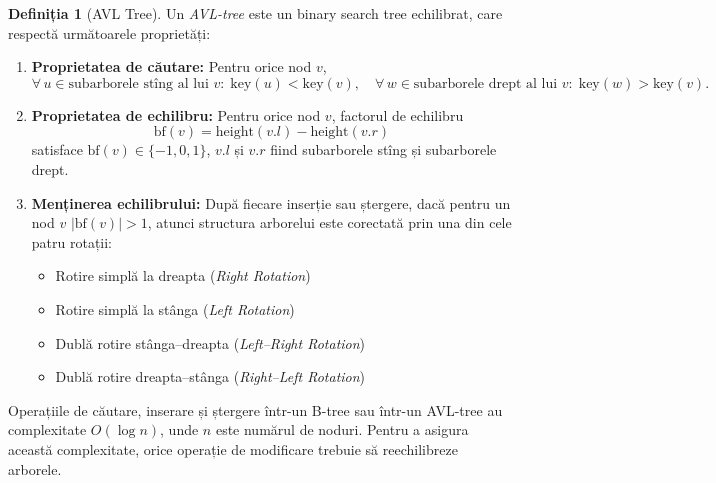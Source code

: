 \documentclass{article}
\theoremstyle{definition}
\newtheorem{defn}{Definiția}
\begin{document}
\begin{defn}[AVL Tree]
	Un \emph{AVL-tree} este un binary search tree echilibrat, care respectă
	următoarele proprietăți:

	\begin{enumerate}
		\item \textbf{Proprietatea de căutare:} Pentru orice nod $v$,
		      \begin{equation*}
			      \forall\, u \in \text{subarborele stîng al
				      lui } v:\; \mathrm{key}(u) <
			      \mathrm{key}(v), \quad \forall\, w \in
			      \text{subarborele drept al lui } v:\;
			      \mathrm{key}(w) > \mathrm{key}(v) \text{.}
		      \end{equation*}
		\item \textbf{Proprietatea de echilibru:} Pentru orice nod $v$, factorul de echilibru
		      \begin{equation*}
			      \mathrm{bf}(v) = \mathrm{height}(v.l) - \mathrm{height}(v.r)
		      \end{equation*}
		      satisface
		      $\mathrm{bf}(v) \in \{-1,0,1\}$, $v.l$ și $v.r$ fiind subarborele stîng și subarborele drept.
		\item \textbf{Menținerea echilibrului:} După fiecare inserție sau ștergere, dacă pentru un nod $v$
		      $\lvert \mathrm{bf}(v)\rvert > 1$, atunci structura arborelui este corectată prin una din cele patru rotații:
		      \begin{itemize}
			      \item Rotire simplă la dreapta (\textit{Right Rotation})
			      \item Rotire simplă la stânga (\textit{Left Rotation})
			      \item Dublă rotire stânga–dreapta (\textit{Left–Right Rotation})
			      \item Dublă rotire dreapta–stânga (\textit{Right–Left Rotation})
		      \end{itemize}
	\end{enumerate}

\end{defn}

Operațiile de căutare, inserare și ștergere într-un B-tree sau într-un AVL-tree
au complexitate $O(\log n)$, unde $n$ este numărul de noduri. Pentru a asigura
această complexitate, orice operație de modificare trebuie să reechilibreze
arborele.
\end{document}
